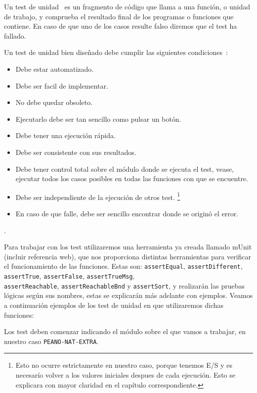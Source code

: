 Un test de unidad~\cite{unitTests} es un fragmento de código que llama a una función, o unidad de trabajo, y comprueba el resultado final de los programas o funciones que contiene. En caso de que uno de los casos resulte falso diremos que el test ha fallado.\par

Un test de unidad bien diseñado debe cumplir las siguientes condiciones~\cite{unitTests}: \par

\begin{itemize}
\item Debe estar automatizado.
\item Debe ser facil de implementar.
\item No debe quedar obsoleto.
\item Ejecutarlo debe ser tan sencillo como pulsar un botón.
\item Debe tener una ejecución rápida.
\item Debe ser consistente con sus resultados. 
\item Debe tener control total sobre el módulo donde se ejecuta el test, vease, ejecutar todos los casos posibles en todas las funciones con que se encuentre.
\item Debe ser independiente de la ejecución de otros test. \footnote{Esto no ocurre estrictamente en nuestro caso, porque tenemos E/S y es necesarío volver a los valores iniciales despues de cada ejecución. Esto se explicara con mayor claridad en el capítulo correspondiente.}
\item En caso de que falle, debe ser sencillo encontrar donde se originó el error.
\end{itemize}.

Para trabajar con los test utilizaremos una herramienta ya creada llamado mUnit (incluir referencia web), que nos proporciona distintas herramientas para verificar el funcionamiento de las funciones. Estas son: \verb"assertEqual", \verb"assertDifferent", \verb"assertTrue", \verb"assertFalse", \verb"assertTrueMsg",\\ \verb"assertReachable", \verb"assertReachableBnd" y \verb"assertSort", y realizarán las pruebas lógicas según sus nombres, estas se explicarán más adelante con ejemplos. Veamos a continuación ejemplos de los test de unidad en que utilizaremos dichas funciones:\par

Los test deben comenzar indicando el módulo sobre el que vamos a trabajar, en nuestro caso \texttt{PEANO-NAT-EXTRA}. \par

